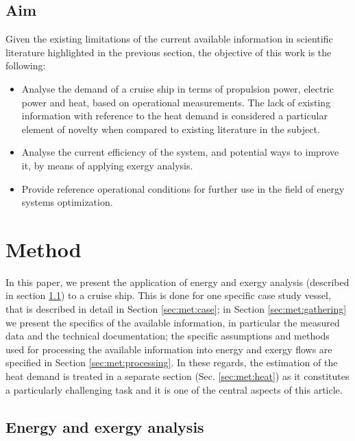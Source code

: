 \documentclass[preprint,12pt]{elsarticle}
\begin{document}
\subsection{Aim}

Given the existing limitations of the current available information in scientific literature highlighted in the previous section, the objective of this work is the following:
\begin{itemize}
	\item Analyse the demand of a cruise ship in terms of propulsion power, electric power and heat, based on operational measurements. The lack of existing information with reference to the heat demand is considered a particular element of novelty when compared to existing literature in the subject.
	\item Analyse the current efficiency of the system, and potential ways to improve it, by means of applying exergy analysis.
	\item Provide reference operational conditions for further use in the field of energy systems optimization.
\end{itemize}





\section{Method} \label{sec:method}

In this paper, we present the application of energy and exergy analysis (described in section \ref{sec:met:energyExergy}) to a cruise ship. This is done for one specific case study vessel, that is described in detail in Section \ref{sec:met:case}; in Section \ref{sec:met:gathering} we present the specifics of the available information, in particular the measured data and the technical documentation; the specific assumptions and methods used for processing the available information into  energy and exergy flows are specified in Section \ref{sec:met:processing}. In these regards, the estimation of the heat demand is treated in a separate section (Sec. \ref{sec:met:heat}) as it constitutes a particularly challenging task and it is one of the central aspects of this article. 

\subsection{Energy and exergy analysis} \label{sec:met:energyExergy}
\end{document}
